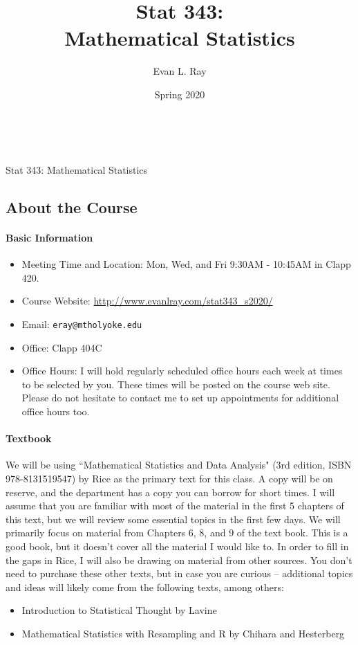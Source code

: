 \documentclass[11pt]{article}
\title{Stat 343:\\Mathematical Statistics}
\author{Evan L. Ray}
\date{Spring 2020}
\begin{document}

\ \\
\vspace{.01in}
\begin{center}
{\large Stat 343: Mathematical Statistics}
\end{center}
\subsection*{About the Course}

\paragraph{Basic Information}  

\begin{itemize}
 \item Meeting Time and Location: Mon, Wed, and Fri 9:30AM - 10:45AM in Clapp 420.
 \item Course Website: \url{http://www.evanlray.com/stat343_s2020/}
 \item Email: \texttt{eray@mtholyoke.edu}
 \item Office: Clapp 404C
 \item Office Hours: I will hold regularly scheduled office hours each week at times to be selected by you.  These times will be posted on the course web site.  Please do not hesitate to contact me to set up appointments for additional office hours too.
\end{itemize}

\paragraph{Textbook}

We will be using ``Mathematical Statistics and Data Analysis" (3rd edition, ISBN 978-8131519547) by Rice as the primary text for this class.  A copy will be on reserve, and the department has a copy you can borrow for short times.  I will assume that you are familiar with most of the material in the first 5 chapters of this text, but we will review some essential topics in the first few days.  We will primarily focus on material from Chapters 6, 8, and 9 of the text book.  This is a good book, but it doesn't cover all the material I would like to.  In order to fill in the gaps in Rice, I will also be drawing on material from other sources.  You don't need to purchase these other texts, but in case you are curious -- additional topics and ideas will likely come from the following texts, among others:
\begin{itemize}
\item Introduction to Statistical Thought by Lavine
\item Mathematical Statistics with Resampling and R by Chihara and Hesterberg
\end{itemize}
\end{document}
